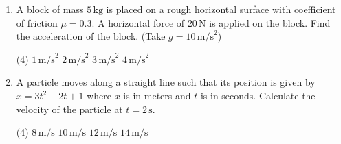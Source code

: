 \begin{enumerate}
\item A block of mass $5\,\text{kg}$ is placed on a rough horizontal surface with coefficient of friction $\mu = 0.3$. A horizontal force of $20\,\text{N}$ is applied on the block. Find the acceleration of the block. (Take $g = 10\,\text{m/s}^2$)

\begin{tasks}(4)
\task $1\,\text{m/s}^2$
\task $2\,\text{m/s}^2$
\task $3\,\text{m/s}^2$
\task $4\,\text{m/s}^2$
\end{tasks}

\item A particle moves along a straight line such that its position is given by $x = 3t^2 - 2t + 1$ where $x$ is in meters and $t$ is in seconds. Calculate the velocity of the particle at $t = 2\,\text{s}$.

\begin{tasks}(4)
\task $8\,\text{m/s}$
\task $10\,\text{m/s}$
\task $12\,\text{m/s}$
\task $14\,\text{m/s}$
\end{tasks}
\end{enumerate}
